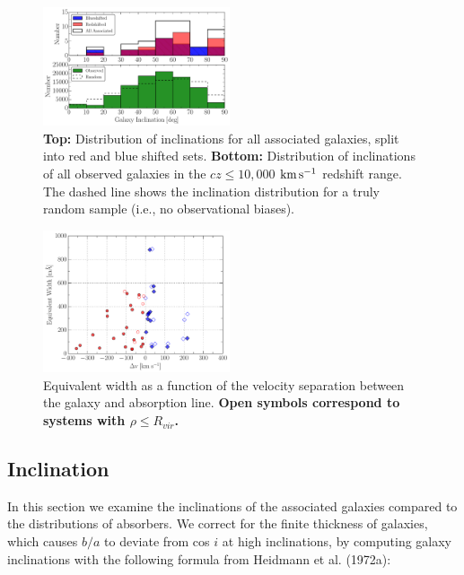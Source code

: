 \documentclass[twocolumn,tighten]{aastex6}
\begin{document}
\begin{figure}[h!]
        \centering
        \includegraphics[width=0.49\textwidth]{fig9.pdf}
        \caption{\small{\textbf{Top: } Distribution of inclinations for all associated galaxies, split into red and blue shifted sets. \textbf{Bottom:} Distribution of inclinations of all observed galaxies in the $cz \leq 10,000$ $\rm km\, s^{-1}$ redshift range. The dashed line shows the inclination distribution for a truly random sample (i.e., no observational biases).}}
        \label{hist_inc}
        \vspace{2pt}
\end{figure}


\begin{figure}[ht!]
        \centering
        \includegraphics[width=0.49\textwidth]{fig10.pdf}
        \caption{\small{Equivalent width as a function of the velocity separation between the galaxy and absorption line. \textbf{Open symbols correspond to systems with $\rho \leq R_{vir}$.}}}
        \label{W_veldif}
        \vspace{5pt}
\end{figure} 

\vspace{10pt}


\subsection{Inclination}
\label{inclination}

In this section we examine the inclinations of the associated galaxies compared to the distributions of absorbers. We correct for the finite thickness of galaxies, which causes $b/a$ to deviate from cos $i$ at high inclinations, by computing galaxy inclinations with the following formula from Heidmann et al. (1972a):
\end{document}
